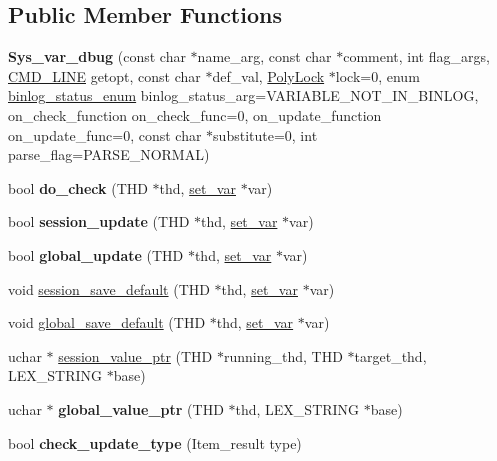\subsection*{Public Member Functions}
\begin{DoxyCompactItemize}
\item 
\mbox{\label{classSys__var__dbug_aa46eee4f0ced5e6cfc359d14a2993f11}} 
{\bfseries Sys\+\_\+var\+\_\+dbug} (const char $\ast$name\+\_\+arg, const char $\ast$comment, int flag\+\_\+args, \mbox{\hyperlink{structCMD__LINE}{C\+M\+D\+\_\+\+L\+I\+NE}} getopt, const char $\ast$def\+\_\+val, \mbox{\hyperlink{classPolyLock}{Poly\+Lock}} $\ast$lock=0, enum \mbox{\hyperlink{classsys__var_a664520ec82191888717c86085bfa83ce}{binlog\+\_\+status\+\_\+enum}} binlog\+\_\+status\+\_\+arg=V\+A\+R\+I\+A\+B\+L\+E\+\_\+\+N\+O\+T\+\_\+\+I\+N\+\_\+\+B\+I\+N\+L\+OG, on\+\_\+check\+\_\+function on\+\_\+check\+\_\+func=0, on\+\_\+update\+\_\+function on\+\_\+update\+\_\+func=0, const char $\ast$substitute=0, int parse\+\_\+flag=P\+A\+R\+S\+E\+\_\+\+N\+O\+R\+M\+AL)
\item 
\mbox{\label{classSys__var__dbug_a84d77bc883bfac06ae56b99071cf5cb6}} 
bool {\bfseries do\+\_\+check} (T\+HD $\ast$thd, \mbox{\hyperlink{classset__var}{set\+\_\+var}} $\ast$var)
\item 
\mbox{\label{classSys__var__dbug_a038681df5e6c14755101e89f64c568bb}} 
bool {\bfseries session\+\_\+update} (T\+HD $\ast$thd, \mbox{\hyperlink{classset__var}{set\+\_\+var}} $\ast$var)
\item 
\mbox{\label{classSys__var__dbug_a63c727e3bf9c17d9c4cf6d8cfa1bf0da}} 
bool {\bfseries global\+\_\+update} (T\+HD $\ast$thd, \mbox{\hyperlink{classset__var}{set\+\_\+var}} $\ast$var)
\item 
void \mbox{\hyperlink{classSys__var__dbug_a6a5b393d2e8fd791ca0d567de63cf995}{session\+\_\+save\+\_\+default}} (T\+HD $\ast$thd, \mbox{\hyperlink{classset__var}{set\+\_\+var}} $\ast$var)
\item 
void \mbox{\hyperlink{classSys__var__dbug_a022ff27659567b4ed8b73f797f0d51bb}{global\+\_\+save\+\_\+default}} (T\+HD $\ast$thd, \mbox{\hyperlink{classset__var}{set\+\_\+var}} $\ast$var)
\item 
uchar $\ast$ \mbox{\hyperlink{classSys__var__dbug_a29c18e5e94b1a579df89714a8adffdaf}{session\+\_\+value\+\_\+ptr}} (T\+HD $\ast$running\+\_\+thd, T\+HD $\ast$target\+\_\+thd, L\+E\+X\+\_\+\+S\+T\+R\+I\+NG $\ast$base)
\item 
\mbox{\label{classSys__var__dbug_a317c7019a026fc5c13525362991df80a}} 
uchar $\ast$ {\bfseries global\+\_\+value\+\_\+ptr} (T\+HD $\ast$thd, L\+E\+X\+\_\+\+S\+T\+R\+I\+NG $\ast$base)
\item 
\mbox{\label{classSys__var__dbug_ab41fc18dd6f0299555acc13cd4e40e1c}} 
bool {\bfseries check\+\_\+update\+\_\+type} (Item\+\_\+result type)
\end{DoxyCompactItemize}
